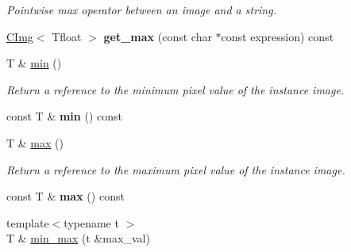 \begin{DoxyCompactItemize}
\begin{DoxyCompactList}\small\item\em Pointwise max operator between an image and a string. \item\end{DoxyCompactList}\item 
\hypertarget{structcimg__library_1_1CImg_a860bf7a329b81b1e40818f1ddde77bbd}{
\hyperlink{structcimg__library_1_1CImg}{CImg}$<$ Tfloat $>$ {\bfseries get\_\-max} (const char $\ast$const expression) const }
\label{structcimg__library_1_1CImg_a860bf7a329b81b1e40818f1ddde77bbd}

\item 
\hypertarget{structcimg__library_1_1CImg_a4dfdacede15a60eb00a588a9f3d4839a}{
T \& \hyperlink{structcimg__library_1_1CImg_a4dfdacede15a60eb00a588a9f3d4839a}{min} ()}
\label{structcimg__library_1_1CImg_a4dfdacede15a60eb00a588a9f3d4839a}

\begin{DoxyCompactList}\small\item\em Return a reference to the minimum pixel value of the instance image. \item\end{DoxyCompactList}\item 
\hypertarget{structcimg__library_1_1CImg_a01164a5a9ce47a184c451d53f145cf44}{
const T \& {\bfseries min} () const }
\label{structcimg__library_1_1CImg_a01164a5a9ce47a184c451d53f145cf44}

\item 
\hypertarget{structcimg__library_1_1CImg_a301155b753f6ab13ff25f164f389e142}{
T \& \hyperlink{structcimg__library_1_1CImg_a301155b753f6ab13ff25f164f389e142}{max} ()}
\label{structcimg__library_1_1CImg_a301155b753f6ab13ff25f164f389e142}

\begin{DoxyCompactList}\small\item\em Return a reference to the maximum pixel value of the instance image. \item\end{DoxyCompactList}\item 
\hypertarget{structcimg__library_1_1CImg_af1a616293569fbda2a769b612c86a8ab}{
const T \& {\bfseries max} () const }
\label{structcimg__library_1_1CImg_af1a616293569fbda2a769b612c86a8ab}

\item 
\hypertarget{structcimg__library_1_1CImg_ae5f7f2487cee985fa4e386644a2c0563}{
{\footnotesize template$<$typename t $>$ }\\T \& \hyperlink{structcimg__library_1_1CImg_ae5f7f2487cee985fa4e386644a2c0563}{min\_\-max} (t \&max\_\-val)}
\label{structcimg__library_1_1CImg_ae5f7f2487cee985fa4e386644a2c0563}


\end{DoxyCompactItemize}
